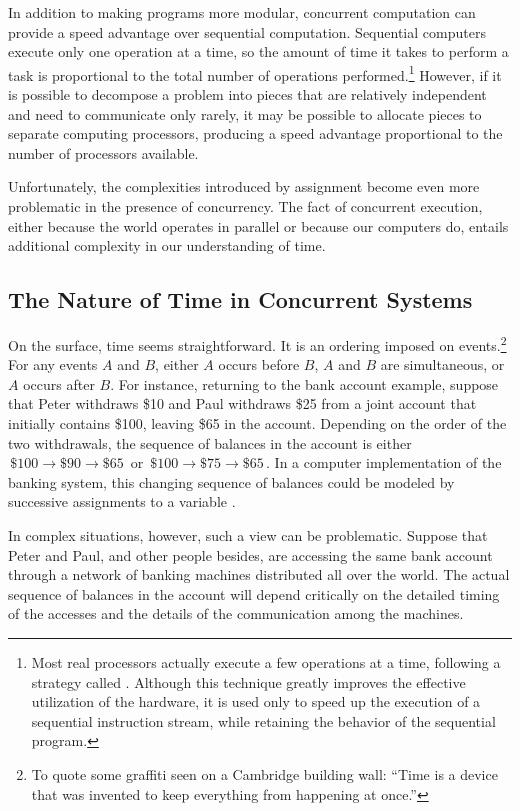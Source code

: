 In addition to making programs more modular, concurrent computation can provide
a speed advantage over sequential computation.  Sequential computers execute
only one operation at a time, so the amount of time it takes to perform a task
is proportional to the total number of operations performed.\footnote{Most real
processors actually execute a few operations at a time, following a strategy
called .  Although this technique greatly improves the
effective utilization of the hardware, it is used only to speed up the
execution of a sequential instruction stream, while retaining the behavior of
the sequential program.}  However, if it is possible to decompose a problem
into pieces that are relatively independent and need to communicate only
rarely, it may be possible to allocate pieces to separate computing processors,
producing a speed advantage proportional to the number of processors available.

Unfortunately, the complexities introduced by assignment become even more
problematic in the presence of concurrency.  The fact of concurrent execution,
either because the world operates in parallel or because our computers do,
entails additional complexity in our understanding of time.



\subsection{The Nature of Time in Concurrent Systems}
\label{Section 3.4.1}

On the surface, time seems straightforward.  It is an ordering imposed on
events.\footnote{To quote some graffiti seen on a Cambridge building wall:
``Time is a device that was invented to keep everything from happening at
once.''}  For any events \( A \) and \( B \), either \( A \) occurs before \( B \),
\( A \) and \( B \) are simultaneous, or \( A \) occurs after \( B \).  For instance,
returning to the bank account example, suppose that Peter withdraws \$10 and
Paul withdraws \$25 from a joint account that initially contains \$100, leaving
\$65 in the account.  Depending on the order of the two withdrawals, the
sequence of balances in the account is either \( \,\$100 \to \$90 \to \$65\, \) or \( \,\$100 \to \$75
\to \$65\, \).  In a computer implementation of the banking system, this changing
sequence of balances could be modeled by successive assignments to a variable
.

In complex situations, however, such a view can be problematic.  Suppose that
Peter and Paul, and other people besides, are accessing the same bank account
through a network of banking machines distributed all over the world.  The
actual sequence of balances in the account will depend critically on the
detailed timing of the accesses and the details of the communication among the
machines.


